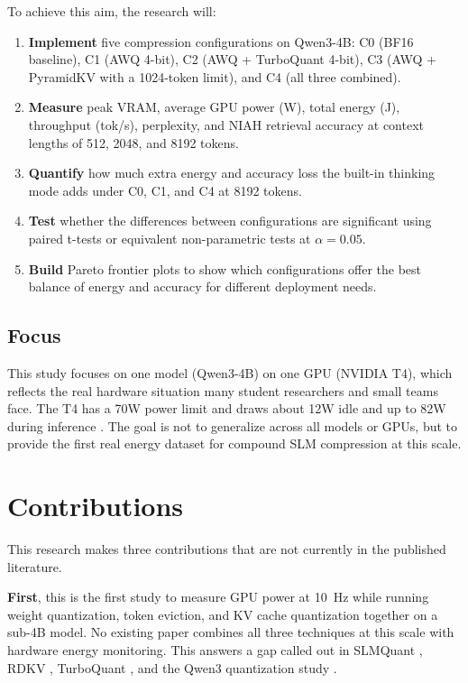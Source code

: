 \documentclass[conference]{IEEEtran}
\begin{document}
To achieve this aim, the research will:
\begin{enumerate}
  \item \textbf{Implement} five compression configurations on \mbox{Qwen3-4B}: C0 (BF16 baseline), C1 (AWQ 4-bit), C2 (AWQ + TurboQuant 4-bit), C3 (AWQ + PyramidKV with a 1024-token limit), and C4 (all three combined).
  \item \textbf{Measure} peak VRAM, average GPU power (W), total energy (J), throughput (tok/s), perplexity, and NIAH retrieval accuracy at context lengths of 512, 2048, and 8192 tokens.
  \item \textbf{Quantify} how much extra energy and accuracy loss the built-in thinking mode adds under C0, C1, and C4 at 8192 tokens.
  \item \textbf{Test} whether the differences between configurations are significant using paired t-tests or equivalent non-parametric tests at $\alpha = 0.05$.
  \item \textbf{Build} Pareto frontier plots to show which configurations offer the best balance of energy and accuracy for different deployment needs.
\end{enumerate}

\subsection{Focus}

This study focuses on one model (\mbox{Qwen3-4B}) on one GPU (NVIDIA T4), which reflects the real hardware situation many student researchers and small teams face. The T4 has a 70W power limit and draws about 12W idle and up to 82W during inference \cite{wattcounts}. The goal is not to generalize across all models or GPUs, but to provide the first real energy dataset for compound SLM compression at this scale.


\section{Contributions}

This research makes three contributions that are not currently in the published literature.

\textbf{First}, this is the first study to measure GPU power at 10~Hz while running weight quantization, token eviction, and KV cache quantization together on a sub-4B model. No existing paper combines all three techniques at this scale with hardware energy monitoring. This answers a gap called out in SLMQuant \cite{slmquant}, RDKV \cite{rdkv}, TurboQuant \cite{turboquant}, and the \mbox{Qwen3} quantization study \cite{qwen3quant2025}.
\end{document}
